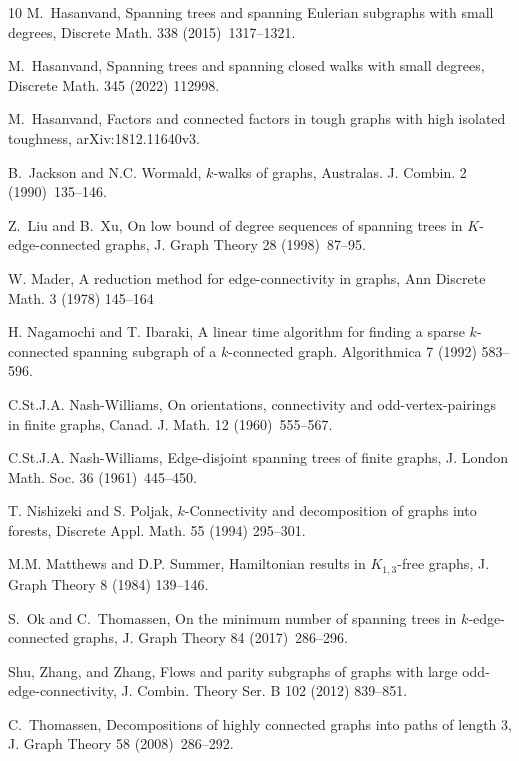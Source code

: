 \documentclass[10pt,bezier]{article}
\begin{document}
\begin{thebibliography}{10}
 M.~Hasanvand, Spanning trees and spanning {E}ulerian subgraphs with small degrees, Discrete Math. 338 (2015)~1317--1321.

 M.~Hasanvand, Spanning trees and spanning closed walks with small degrees, Discrete Math. 345 (2022) 112998.

 M.~Hasanvand, Factors and connected factors in tough graphs with high isolated toughness, arXiv:1812.11640v3.

B.~Jackson and N.C. Wormald, {$k$}-walks of graphs, Australas. J. Combin. 2 (1990)~135--146.

 Z.~Liu and B.~Xu, On low bound of degree sequences of spanning trees
 in {$K$}-edge-connected graphs, J. Graph Theory 28 (1998)~87--95.


W. Mader, A reduction method for edge-connectivity in graphs, Ann Discrete Math. 3 (1978) 145--164

H. Nagamochi and T. Ibaraki, A linear time algorithm for finding a sparse $k$-connected spanning subgraph of a $k$-connected graph. Algorithmica 7 (1992) 583--596. 

 C.St.J.A. Nash-Williams, On orientations, connectivity and
 odd-vertex-pairings in finite graphs, Canad. J. Math. 12 (1960)~555--567.

C.St.J.A. Nash-Williams, Edge-disjoint spanning trees of finite graphs, J. London Math. Soc. 36 (1961)~445--450.

T. Nishizeki and S. Poljak, $k$-Connectivity and decomposition of graphs into forests, Discrete Appl. Math. 55 (1994) 295--301. 

M.M. Matthews and D.P. Summer, Hamiltonian results in $K_{1,3}$-free 
graphs, J. Graph Theory 8 (1984) 139--146. 

 S.~Ok and C.~Thomassen, On the minimum number of spanning trees in {$k$}-edge-connected graphs, J. Graph Theory 84 (2017)~286--296.

Shu, Zhang, and Zhang, Flows and parity subgraphs of graphs with large odd-edge-connectivity, 
J. Combin. Theory Ser. B 102 (2012) 839--851.

 C.~Thomassen, Decompositions of highly connected graphs into paths of length 3, J. Graph Theory 58 (2008)~286--292.


\end{thebibliography}
\end{document}
